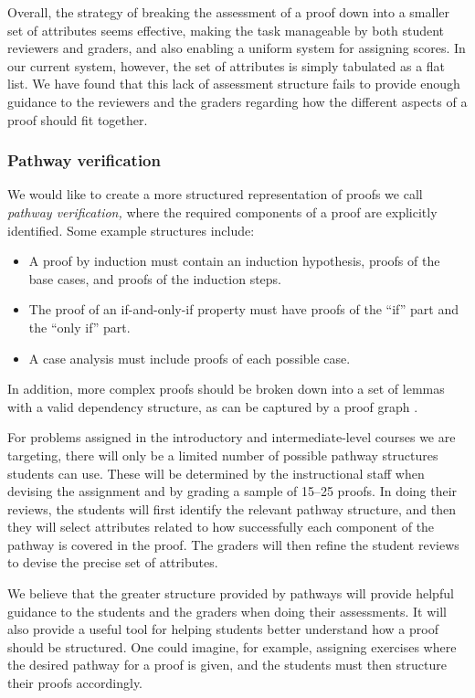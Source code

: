 \documentclass[12pt]{article}
\begin{document}
Overall, the strategy of breaking the assessment of a proof down into a smaller
set of attributes seems effective, making the task manageable by
both student reviewers and graders, and also enabling a uniform
system for assigning scores.  In our current system, however, the set
of attributes is simply tabulated as a flat list.  We have found that
this lack of assessment structure fails to provide enough guidance to the
reviewers and the graders regarding how the different aspects of a
proof should fit together.

\subsubsection*{Pathway verification}

We would like to
create a more structured representation of proofs we call {\em pathway
  verification,}  where the required components of a proof are
explicitly identified.  Some example structures include:
\begin{itemize}
\item A proof by induction must contain an induction hypothesis,
  proofs of the base cases, and proofs of the induction steps.
\item The proof of an if-and-only-if property must have proofs of the
  ``if'' part and the ``only if'' part.
\item A case analysis must include proofs of each possible case.
\end{itemize}
In addition, more complex proofs should be broken down into a set of
lemmas with a valid dependency structure,
as can be captured by a proof graph \cite{anderson-science85}.

For problems assigned in the introductory and intermediate-level
courses we are targeting, there will only be a limited number of
possible pathway structures students can use.  These will be
determined by the instructional staff when devising the assignment and
by grading a sample of 15--25 proofs.  In doing their reviews, the
students will first identify the relevant pathway structure, and then
they will select attributes related to how successfully each component
of the pathway is covered in the proof.  The graders will then refine
the student reviews to devise the precise set of attributes.

We believe that the greater structure provided by pathways will
provide helpful guidance to the students and the graders when doing
their assessments.  It will also provide a useful tool for helping
students better understand how a proof should be structured.  One
could imagine, for example, assigning exercises where the
desired pathway for a proof is given, and the students must
then structure their proofs accordingly.
\end{document}
